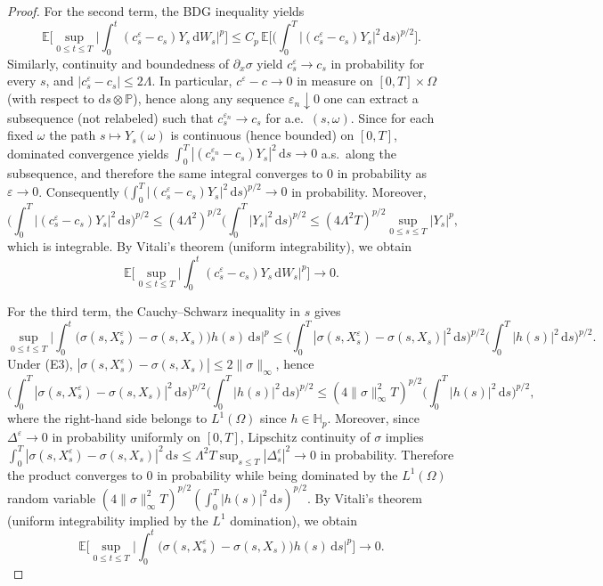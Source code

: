 \documentclass[11pt]{article}
\newcommand{\E}{\mathbb{E}}
\newcommand{\Pbb}{\mathbb{P}}
\newcommand{\Hb}{\mathbb{H}}
\newcommand{\1}{\mathbf{1}}
\newcommand{\dd}{\mathrm{d}}
\theoremstyle{plain}
\theoremstyle{definition}
\theoremstyle{remark}
\begin{document}
\begin{proof}
For the second term, the BDG inequality yields
\[
\E\Big[\sup_{0\le t\le T}\Big|\int_0^t (c_s^\varepsilon-c_s)Y_s\,\dd W_s\Big|^p\Big]
\le C_p\,\E\Big[\Big(\int_0^T |(c_s^\varepsilon-c_s)Y_s|^2\,\dd s\Big)^{p/2}\Big].
\]
Similarly, continuity and boundedness of $\partial_x\sigma$ yield $c_s^\varepsilon\to c_s$ in probability for every $s$, and $|c_s^\varepsilon-c_s|\le 2\Lambda$.
In particular, $c^\varepsilon-c\to0$ in measure on $[0,T]\times\Omega$ (with respect to $\dd s\otimes\Pbb$), hence along any sequence $\varepsilon_n\downarrow0$ one can extract a subsequence (not relabeled) such that $c_s^{\varepsilon_n}\to c_s$ for a.e.\ $(s,\omega)$.
Since for each fixed $\omega$ the path $s\mapsto Y_s(\omega)$ is continuous (hence bounded) on $[0,T]$, dominated convergence yields $\int_0^T |(c_s^{\varepsilon_n}-c_s)Y_s|^2\,\dd s\to0$ a.s.\ along the subsequence, and therefore the same integral converges to $0$ in probability as $\varepsilon\to0$.
Consequently $\big(\int_0^T |(c_s^\varepsilon-c_s)Y_s|^2\,\dd s\big)^{p/2}\to0$ in probability.
Moreover,
\[
\Big(\int_0^T |(c_s^\varepsilon-c_s)Y_s|^2\,\dd s\Big)^{p/2}
\le (4\Lambda^2)^{p/2}\Big(\int_0^T |Y_s|^2\,\dd s\Big)^{p/2}
\le (4\Lambda^2T)^{p/2}\sup_{0\le s\le T}|Y_s|^p,
\]
which is integrable. By Vitali's theorem (uniform integrability), we obtain
\[
\E\Big[\sup_{0\le t\le T}\Big|\int_0^t (c_s^\varepsilon-c_s)Y_s\,\dd W_s\Big|^p\Big]\longrightarrow 0.
\]

For the third term, the Cauchy--Schwarz inequality in $s$ gives
\[
\sup_{0\le t\le T}\Big|\int_0^t \big(\sigma(s,X_s^\varepsilon)-\sigma(s,X_s)\big)h(s)\,\dd s\Big|^p
\le \Big(\int_0^T |\sigma(s,X_s^\varepsilon)-\sigma(s,X_s)|^2\,\dd s\Big)^{p/2}\Big(\int_0^T |h(s)|^2\,\dd s\Big)^{p/2}.
\]
Under (E3), $|\sigma(s,X_s^\varepsilon)-\sigma(s,X_s)|\le 2\|\sigma\|_\infty$, hence
\[
\Big(\int_0^T |\sigma(s,X_s^\varepsilon)-\sigma(s,X_s)|^2\,\dd s\Big)^{p/2}\Big(\int_0^T |h(s)|^2\,\dd s\Big)^{p/2}
\le (4\|\sigma\|_\infty^2 T)^{p/2}\Big(\int_0^T |h(s)|^2\,\dd s\Big)^{p/2},
\]
where the right-hand side belongs to $L^1(\Omega)$ since $h\in \Hb_p$.
Moreover, since $\Delta^\varepsilon\to0$ in probability uniformly on $[0,T]$, Lipschitz continuity of $\sigma$
implies $\int_0^T |\sigma(s,X_s^\varepsilon)-\sigma(s,X_s)|^2\,\dd s\le \Lambda^2T\sup_{s\le T}|\Delta_s^\varepsilon|^2\to0$ in probability.
Therefore the product converges to $0$ in probability while being dominated by the $L^1(\Omega)$ random variable $(4\|\sigma\|_\infty^2 T)^{p/2}(\int_0^T |h(s)|^2\,\dd s)^{p/2}$.
By Vitali's theorem (uniform integrability implied by the $L^1$ domination), we obtain
\[
\E\Big[\sup_{0\le t\le T}\Big|\int_0^t \big(\sigma(s,X_s^\varepsilon)-\sigma(s,X_s)\big)h(s)\,\dd s\Big|^p\Big]\longrightarrow 0.
\]


\end{proof}
\end{document}

